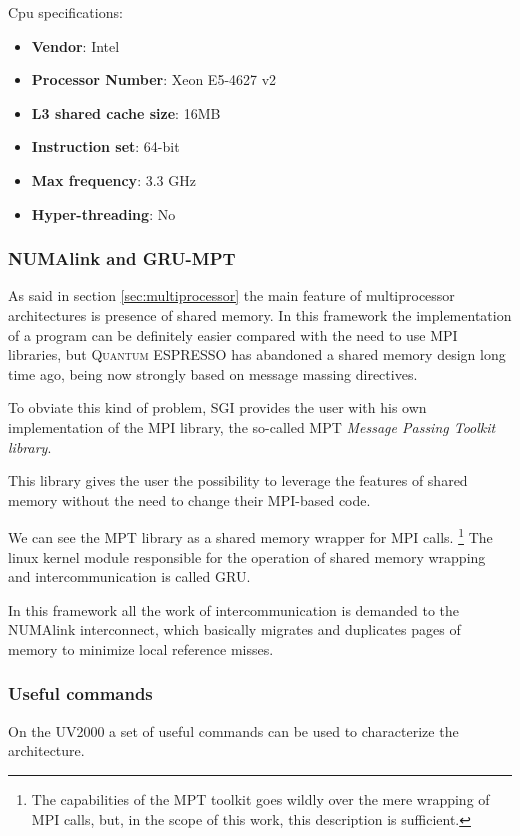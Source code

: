 \documentclass[a4paper,12pt]{article}
\newcommand\QE{\textsc{Quantum} ESPRESSO }
\begin{document}
Cpu specifications:

\begin{itemize}
\item \textbf{Vendor}: Intel
\item \textbf{Processor Number}: Xeon E5-4627 v2
\item \textbf{L3 shared cache size}: 16MB
\item \textbf{Instruction set}: 64-bit
\item \textbf{Max frequency}: 3.3 GHz
\item \textbf{Hyper-threading}: No 
\end{itemize}


\subsubsection{NUMAlink and GRU-MPT}
As said in section \ref{sec:multiprocessor} the main feature of multiprocessor architectures is presence of shared memory.
In this framework the implementation of a program can be definitely easier compared with the need to use MPI libraries, but \QE has abandoned a shared memory design long time ago, being now strongly based on message massing directives.

To obviate this kind of problem, SGI provides the user with his own implementation of the MPI library, the so-called MPT\cite{MPT} \textit{Message Passing Toolkit library}.

This library gives the user the possibility to leverage the features of shared memory without the need to change their MPI-based code. 

We can see the MPT library as a shared memory wrapper for MPI calls. \footnote{The capabilities of the MPT toolkit goes wildly over the mere wrapping of MPI calls, but, in the scope of this work, this description is sufficient.}
The linux kernel module responsible for the operation of shared memory wrapping and intercommunication is called GRU.

In this framework all the work of intercommunication is demanded to the NUMAlink interconnect, which basically migrates and duplicates pages of memory to minimize local reference misses.


\subsubsection{Useful commands}\label{sec:UsefulCommands}
On the UV2000 a set of useful commands can be used to characterize the architecture.
\end{document}
